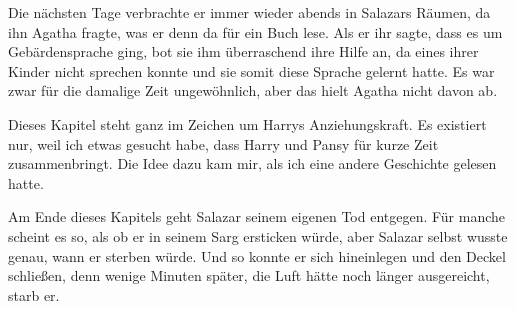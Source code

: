 Die nächsten Tage verbrachte er immer wieder abends in Salazars Räumen, da ihn Agatha fragte, was er denn da für ein Buch lese. Als er ihr sagte, dass es um Gebärdensprache ging, bot sie ihm überraschend ihre Hilfe an, da eines ihrer Kinder nicht sprechen konnte und sie somit diese Sprache gelernt hatte. Es war zwar für die damalige Zeit ungewöhnlich, aber das hielt Agatha nicht davon ab.




\begin{kommentar}
Dieses Kapitel steht ganz im Zeichen um Harrys Anziehungskraft. Es existiert nur, weil ich etwas gesucht habe, dass Harry und Pansy für kurze Zeit zusammenbringt. Die Idee dazu kam mir, als ich eine andere Geschichte gelesen hatte.
\end{kommentar}

\begin{kommentar}
Am Ende dieses Kapitels geht Salazar seinem eigenen Tod entgegen. Für manche scheint es so, als ob er in seinem Sarg ersticken würde, aber Salazar selbst wusste genau, wann er sterben würde. Und so konnte er sich hineinlegen und den Deckel schließen, denn wenige Minuten später, die Luft hätte noch länger ausgereicht, starb er.
\end{kommentar}
